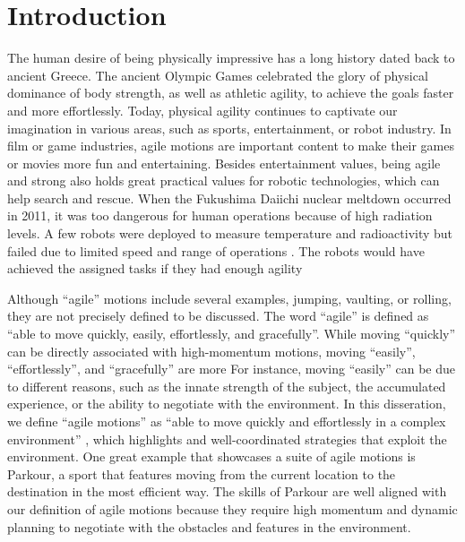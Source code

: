 \chapter{Introduction}

The human desire of being physically impressive has a long history
dated back to ancient Greece.
The ancient Olympic Games celebrated the glory of physical dominance of
body strength, as well as athletic agility, to achieve the goals
faster and more effortlessly. 
Today, physical agility continues to captivate our imagination in
various areas, such as sports, entertainment, or robot industry.
In film or game industries, agile motions are important content to make
their games or movies more fun and entertaining.
Besides entertainment values, being agile and strong also holds great practical
values for robotic technologies,
which can help search and rescue.
When the Fukushima Daiichi nuclear meltdown occurred in 2011,
it was too dangerous for human operations because of high radiation levels.
A few robots were deployed to
measure temperature and radioactivity but failed due to limited speed and range
of operations \cite{Fukushima:2014:URL}.
The robots would have achieved the assigned tasks if they had 
enough agility

Although ``agile'' motions include several examples, jumping,
vaulting, or rolling, they are not precisely defined to be discussed.
The word ``agile'' is defined as 
``able to move quickly, easily, effortlessly, and gracefully''.
While moving ``quickly'' can be directly associated with high-momentum
motions, moving ``easily'', ``effortlessly'', and ``gracefully'' are more
For instance, moving ``easily'' can be due to different reasons, such as the
innate strength of the subject, the accumulated 
experience, or the ability to negotiate with the environment.
In this disseration, we define ``agile motions'' as 
``able to move quickly and effortlessly in a complex environment''
, which highlights 
and well-coordinated strategies that exploit the environment.
One great example that showcases a suite of agile motions is Parkour,
a sport that features moving from the current location to the destination in
the most efficient way.
The skills of Parkour are well aligned with our definition of agile motions
because they require high momentum and dynamic planning to negotiate with the
obstacles and features in the environment.


